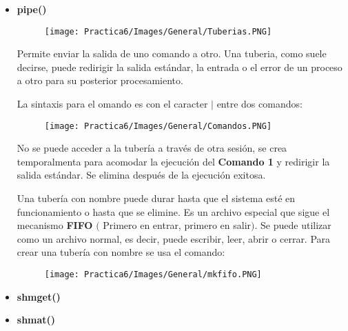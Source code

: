 \documentclass[12pt]{article}
\begin{document}
      \begin{itemize}
        \item[\Checkmark] \textbf{pipe()} \\

          \begin{figure}[h!]
                \centering
               \texttt{[image: Practica6/Images/General/Tuberias.PNG]}
          \end{figure}
          Permite enviar la salida de uno comando a otro. Una \textsf{tuberia}, como suele decirse, puede redirigir la salida estándar, la entrada o el error de un proceso a otro para su posterior procesamiento.

          La sintaxis para el omando es con el caracter $|$ entre dos comandos:

          \begin{figure}[h!]
                \centering
               \texttt{[image: Practica6/Images/General/Comandos.PNG]}
          \end{figure}

          No se puede acceder a la tubería a través de otra sesión, se crea temporalmenta para acomodar la ejecución del \textbf{Comando 1} y redirigir la salida estándar. Se elimina después de la ejecución exitosa.

          Una tubería con nombre puede durar hasta que el sistema esté en funcionamiento o hasta que se elimine. Es un archivo especial que sigue el mecanismo \textbf{FIFO} $($ Primero en entrar, primero en salir$)$. Se puede utilizar como un archivo normal, es decir, puede escribir, leer, abrir o cerrar. Para crear una tubería con nombre se usa el comando:

          \begin{figure}[h!]
                \centering
               \texttt{[image: Practica6/Images/General/mkfifo.PNG]}
          \end{figure}

        \item[\Checkmark] \textbf{shmget()}
        \item[\Checkmark] \textbf{shmat()}
      \end{itemize}
      
          
\end{document}
